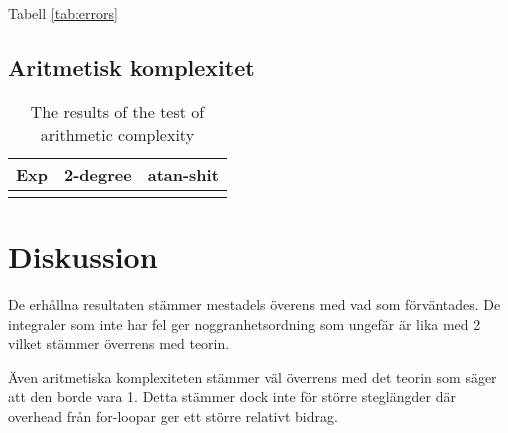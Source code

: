 \documentclass[a4paper,titlepage]{article}
\begin{document}
Tabell \ref{tab:errors}

\subsection{Aritmetisk komplexitet}



\begin{table}[h]
    \begin{tabular}{l | l | l}
        \textbf{Exp} & \textbf{2-degree} & \textbf{atan-shit} \\ \hline

    \caption{The results of the test of arithmetic complexity}
    \end{tabular}
\end{table}


\section{Diskussion}

De erhållna resultaten stämmer mestadels överens med vad som förväntades. De integraler
som inte har fel ger noggranhetsordning som ungefär är lika med 2 vilket stämmer överrens
med teorin.

Även aritmetiska komplexiteten stämmer väl överrens med det teorin som säger att
den borde vara 1. Detta stämmer dock inte för större steglängder där overhead från
for-loopar ger ett större relativt bidrag.
\end{document}
